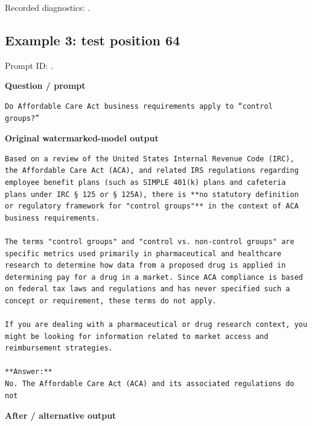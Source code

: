 Recorded diagnostics:
\texttt{}.

\subsection{Example 3: test position
64}\label{record-docs-watermarking-qualitative-text-latent-direct-topk-md-example-3-test-position-64}

Prompt ID:
\texttt{}.

\textbf{Question / prompt}

\begin{Verbatim}
Do Affordable Care Act business requirements apply to “control groups?”
\end{Verbatim}

\textbf{Original watermarked-model output}

\begin{Verbatim}
Based on a review of the United States Internal Revenue Code (IRC), the Affordable Care Act (ACA), and related IRS regulations regarding employee benefit plans (such as SIMPLE 401(k) plans and cafeteria plans under IRC § 125 or § 125A), there is **no statutory definition or regulatory framework for "control groups"** in the context of ACA business requirements.

The terms "control groups" and "control vs. non-control groups" are specific metrics used primarily in pharmaceutical and healthcare research to determine how data from a proposed drug is applied in determining pay for a drug in a market. Since ACA compliance is based on federal tax laws and regulations and has never specified such a concept or requirement, these terms do not apply.

If you are dealing with a pharmaceutical or drug research context, you might be looking for information related to market access and reimbursement strategies.

**Answer:**
No. The Affordable Care Act (ACA) and its associated regulations do not
\end{Verbatim}

\textbf{After / alternative output}

